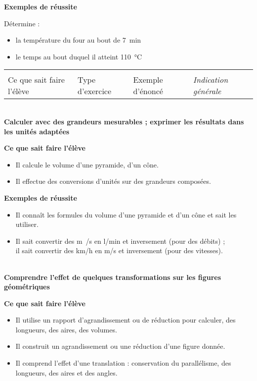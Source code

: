 \documentclass[10pt]{article}
\newcommand{\RR}{\begin{tikzpicture} \draw[BleuRoi,fill=BleuRoi] (0,0) circle (0.06); \end{tikzpicture}}
\newcommand{\LR}{\begin{tikzpicture} \draw[BleuRoi,fill=BleuRoi] (0.05,0) -- (0,0.075) -- (-0.05,0) -- (0,-0.075) --cycle; \end{tikzpicture}}
\newcommand{\CR}{\begin{tikzpicture} \draw[BleuRoi,fill=BleuRoi] (0,0) -- (0,0.1) -- (0.1,0.1) -- (0.1,0) -- cycle; \end{tikzpicture}}
\newcommand{\theme}[1]
{\vspace{4ex}\begin{tabularx}{\textwidth}{|XXXX|}\arrayrulecolor{BleuRoi}
    \multicolumn{4}{c}{\sffamily\color{white}\cellcolor{BleuRoi}\Large{\phantom{É}#1\phantom{É}}\rmfamily} \\\normalsize
    \RR{} Ce que sait faire l'élève & \LR{} Type d'exercice & \CR{} Exemple d'énoncé & \textit{Indication générale} \\\hline
\end{tabularx}\vspace{3ex}}
\newcommand{\competence}[1]{\par\color{BleuRoi}\makebox[\linewidth]{\rule{\textwidth}{2pt}}\\{\bfseries\Large#1}\color{black}\vspace{1em}}
\newenvironment{savoireleves}{%
    \renewcommand{\labelitemi}{\RR}%
    \color{black}%
    \par\textbf{Ce que sait faire l'élève}
    \begin{itemize}
    \setlength{\itemsep}{-0.2em}%
}{
    \end{itemize}
}
\newenvironment{exemplesreussite}{%
    \renewcommand{\labelitemi}{\LR}%
    \renewcommand{\labelitemii}{-}%
    \color{black}%
    \par\textbf{Exemples de réussite}
    \begin{itemize}
    \setlength{\itemsep}{-0.2em}%
}{
    \end{itemize}
}
\newenvironment{sousitemize}{
    \color{black}%
    \vspace{-1em}%
    \begin{itemize}
    \setlength{\itemsep}{0em}%
}{
    \end{itemize}
}
\begin{document}
\begin{exemplesreussite}
        Détermine :
        \begin{sousitemize}
            \item la température du four au bout de \qty{7}{min} 
            \item le temps au bout duquel il atteint \qty{110}{\degreeCelsius}
        \end{sousitemize}
    \end{exemplesreussite}

    \clearpage
    \theme{GRANDEURS ET MESURES}
    \competence{Calculer avec des grandeurs mesurables ; exprimer les résultats dans les unités adaptées}

    \begin{savoireleves}
        \item Il calcule le volume d’une pyramide, d’un cône.
        \item Il effectue des conversions d’unités sur des grandeurs composées.
    \end{savoireleves}

    \begin{exemplesreussite}
        \item Il connaît les formules du volume d’une pyramide et d’un cône et sait les utiliser.
        \item Il sait convertir des \unit{\metre\cube/\second} en \unit{\litre/\minute} et inversement (pour des débits) ;\\
        il sait convertir des \unit{\kilo\metre/\hour} en \unit{\metre/\second} et inversement (pour des vitesses).
    \end{exemplesreussite}

    \competence{Comprendre l’effet de quelques transformations sur les figures géométriques}
    \begin{savoireleves}
        \item Il utilise un rapport d’agrandissement ou de réduction pour calculer, des longueurs, des aires, des volumes.
        \item Il construit un agrandissement ou une réduction d’une figure donnée.
        \item Il comprend l’effet d’une translation : conservation du parallélisme, des longueurs, des aires et des angles.
    \end{savoireleves}
\end{document}
